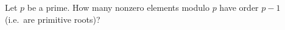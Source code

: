 \begin{problem}
    Let $p$ be a prime. How many nonzero elements modulo $p$ have order $p-1$
    (i.e.\ are primitive roots)?

    \label{Z762216A}
\end{problem}